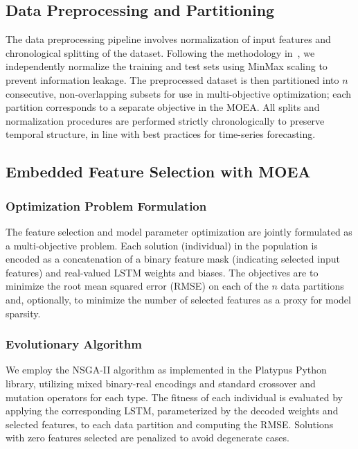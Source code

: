 \documentclass[12pt]{article}
\begin{document}
\subsection{Data Preprocessing and Partitioning}

The data preprocessing pipeline involves normalization of input features and chronological splitting of the dataset. Following the methodology in~\cite{espinosa2023efs}, we independently normalize the training and test sets using MinMax scaling to prevent information leakage. The preprocessed dataset is then partitioned into $n$ consecutive, non-overlapping subsets for use in multi-objective optimization; each partition corresponds to a separate objective in the MOEA. All splits and normalization procedures are performed strictly chronologically to preserve temporal structure, in line with best practices for time-series forecasting.

\subsection{Embedded Feature Selection with MOEA}

\subsubsection{Optimization Problem Formulation}

The feature selection and model parameter optimization are jointly formulated as a multi-objective problem. Each solution (individual) in the population is encoded as a concatenation of a binary feature mask (indicating selected input features) and real-valued LSTM weights and biases. The objectives are to minimize the root mean squared error (RMSE) on each of the $n$ data partitions and, optionally, to minimize the number of selected features as a proxy for model sparsity.

\subsubsection{Evolutionary Algorithm}

We employ the NSGA-II algorithm as implemented in the Platypus Python library, utilizing mixed binary-real encodings and standard crossover and mutation operators for each type. The fitness of each individual is evaluated by applying the corresponding LSTM, parameterized by the decoded weights and selected features, to each data partition and computing the RMSE. Solutions with zero features selected are penalized to avoid degenerate cases.
\end{document}

